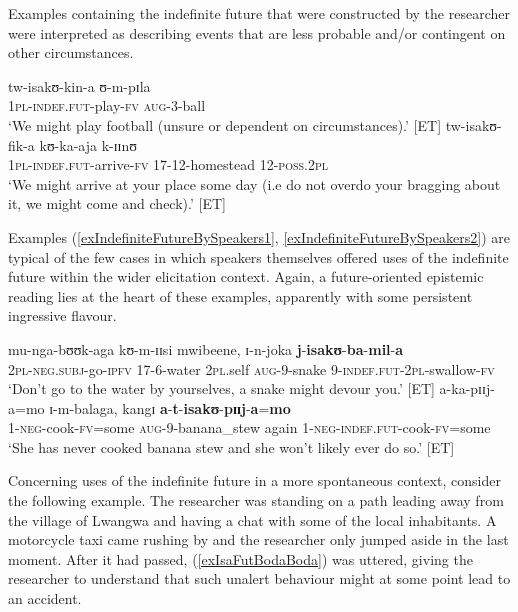 Examples containing the indefinite future that were constructed by the researcher were interpreted as describing events that are less probable and/or contingent on other circumstances.

\begin{exe}
\ex\gll tw-isakʊ-kin-a ʊ-m-pɪla\\
\textsc{1pl}-\textsc{indef.fut}-play-\textsc{fv} \textsc{aug}-3-ball\\
\glt \lq We might play football (unsure or dependent on circumstances).' [ET]
\ex\gll tw-isakʊ-fik-a kʊ-ka-aja k-ɪɪnʊ\\
\textsc{1pl}-\textsc{indef.fut}-arrive-\textsc{fv} 17-12-homestead 12-\textsc{poss.2pl}\\
\glt \lq We might arrive at your place some day (i.e do not overdo your bragging about it, we might come and check).' [ET]
\end{exe}

Examples (\ref{exIndefiniteFutureBySpeakers1}, \ref{exIndefiniteFutureBySpeakers2}) are typical of the few cases in which speakers themselves offered uses of the indefinite future within the wider elicitation context. Again, a future-oriented epistemic reading lies at the heart of these examples, apparently with some persistent ingressive flavour.

\begin{exe}
\ex \label{exIndefiniteFutureBySpeakers1} \gll mu-nga-bʊʊk-aga kʊ-m-ɪɪsi mwibeene, ɪ-n-joka \textbf{j}-\textbf{isakʊ}-\textbf{ba}-\textbf{mil}-\textbf{a}\\
\textsc{2pl}-\textsc{neg.subj}-go-\textsc{ipfv} 17-6-water \textsc{2pl}.self \textsc{aug}-9-snake 9-\textsc{indef.fut}-\textsc{2pl}-swallow-\textsc{fv}\\
\glt \lq Don't go to the water by yourselves, a snake might devour you.' [ET]
\ex \label{exIndefiniteFutureBySpeakers2} \gll a-ka-pɪɪj-a=mo ɪ-m-balaga, kangɪ \textbf{a}-\textbf{t}-\textbf{isakʊ}-\textbf{pɪɪj}-\textbf{a}=\textbf{mo}\\
1-\textsc{neg}-cook-\textsc{fv}=some \textsc{aug}-9-banana\_stew again 1-\textsc{neg}-\textsc{indef.fut}-cook-\textsc{fv}=some\\
\glt `She has never cooked banana stew and she won't likely ever do so.' [ET]
\end{exe}

Concerning uses of the indefinite future in a more spontaneous context, consider the following example. The researcher was standing on a path leading away from the village of Lwangwa and having a chat with some of the local inhabitants. A motorcycle taxi came rushing by and the researcher only jumped aside in the last moment. After it had passed, (\ref{exIsaFutBodaBoda}) was uttered, giving the researcher to understand that such unalert behaviour might at some point lead to an accident.

